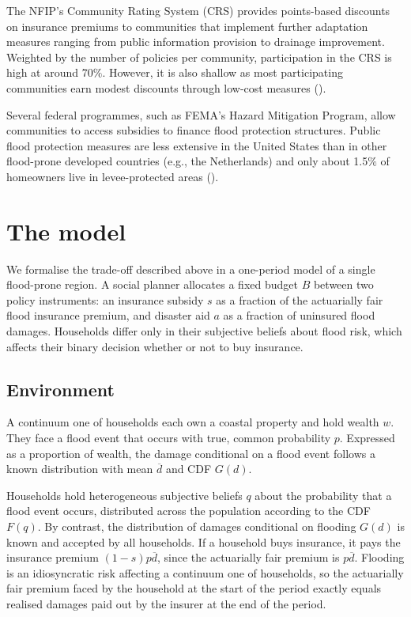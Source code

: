\documentclass[12pt]{article}
\begin{document}
The NFIP's Community Rating System (CRS) provides points-based discounts on insurance premiums to communities that implement further adaptation measures ranging from public information provision to drainage improvement. Weighted by the number of policies per community, participation in the CRS is high at around 70$\%$. However, it is also shallow as most participating communities earn modest discounts through low-cost measures (\cite{fema2021crs}).

Several federal programmes, such as FEMA's Hazard Mitigation Program, allow communities to access subsidies to finance flood protection structures. Public flood protection measures are less extensive in the United States than in other flood-prone developed countries (e.g., the Netherlands) and only about 1.5$\%$ of homeowners live in levee-protected areas (\citealp{qin2026flood}).

\section{The model}
\label{sec:model}

We formalise the trade-off described above in a one-period model of a single flood-prone region. A social planner allocates a fixed budget $B$ between two policy instruments: an insurance subsidy $s$ as a fraction of the actuarially fair flood insurance premium, and disaster aid $a$ as a fraction of uninsured flood damages. Households differ only in their subjective beliefs about flood risk, which affects their binary decision whether or not to buy insurance.

\subsection{Environment}

A continuum one of households each own a coastal property and hold wealth $w$. They face a flood event that occurs with true, common probability $p$. Expressed as a proportion of wealth, the damage conditional on a flood event  follows a known distribution with mean $\overline{d}$ and CDF $G(d)$.

Households hold heterogeneous subjective beliefs $q$ about the probability that a flood event occurs, distributed across the population according to the CDF $F(q)$. By contrast, the distribution of damages conditional on flooding $G(d)$ is known and accepted by all households. If a household buys insurance, it pays the insurance premium $(1-s)p\overline{d}$, since the actuarially fair premium is $p\overline{d}$. Flooding is an idiosyncratic risk affecting a continuum one of households, so the actuarially fair premium faced by the household at the start of the period exactly equals realised damages paid out by the insurer at the end of the period.
\end{document}
